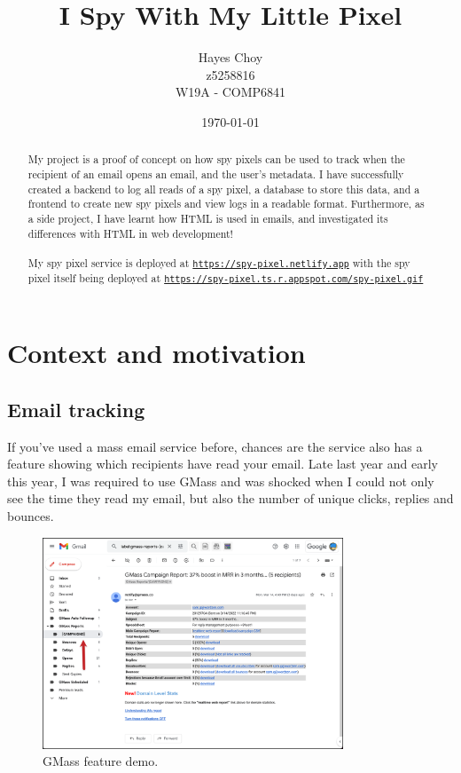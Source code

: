 \documentclass{article}
\title{I Spy With My Little Pixel}
\author{Hayes Choy\\z5258816\\W19A - COMP6841}
\date{\today}
\begin{document}
\maketitle

\begin{abstract} 
\noindent My project is a proof of concept on how spy pixels can be used to track when the recipient of an email opens an email, and the user’s metadata. I have successfully created a backend to log all reads of a spy pixel, a database to store this data, and a frontend to create new spy pixels and view logs in a readable format. Furthermore, as a side project, I have learnt how HTML is used in emails, and investigated its differences with HTML in web development!
\\
\\
My spy pixel service is deployed at \href{https://spy-pixel.netlify.app}{\texttt{https://spy-pixel.netlify.app}} with the spy pixel itself being deployed at \href{https://spy-pixel.ts.r.appspot.com/spy-pixel.gif}{\texttt{https://spy-pixel.ts.r.appspot.com/spy-pixel.gif}}

\end{abstract}

\section{\label{context}Context and motivation}

\subsection{Email tracking}

If you've used a mass email service before, chances are the service also has a feature showing which recipients have read your email. Late last year and early this year, I was required to use GMass and was shocked when I could not only see the time they read my email, but also the number of unique clicks, replies and bounces.

\begin{figure}[H]
\centering
\includegraphics[width=0.8\textwidth]{images/gmass.png}
\caption{\label{fig1}GMass feature demo.}
\end{figure}
\end{document}
